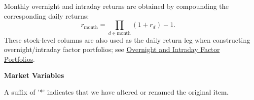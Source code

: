 \documentclass[12pt,title,fleqn]{article}
\begin{document}
Monthly overnight and intraday returns are obtained by compounding the corresponding daily returns:
\[
    r_{\mathrm{month}}
        = \prod_{d \in \mathrm{month}} \left(1 + r_d\right) - 1.
\]
These stock-level columns are also used as the daily return leg when constructing overnight/intraday factor portfolios; see \hyperref[sec:oi-portfolios]{Overnight and Intraday Factor Portfolios}.

\noindent\textbf{Market Variables}

\noindent A suffix of '\mbox{*}' indicates that we have altered or renamed the original item. 

\setlength\LTcapwidth{\textwidth} %

\setlength\LTleft{0pt}            %
\setlength\LTright{0pt}           %
\end{document}
